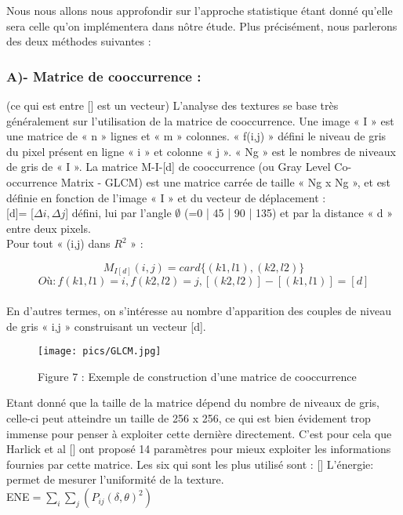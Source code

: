\documentclass[12pt]{article}
\begin{document}
Nous nous allons nous approfondir sur l’approche statistique étant donné qu’elle sera celle qu’on implémentera dans nôtre étude.
Plus précisément, nous parlerons des deux méthodes suivantes : 

\subsubsection*{A)- Matrice de cooccurrence :} (ce qui est entre [] est un vecteur)
L’analyse des textures se base très généralement sur l’utilisation de la matrice de cooccurrence.
Une image « I » est une matrice de « n » lignes et « m » colonnes. « f(i,j) » défini le niveau de gris du pixel présent en ligne « i » et  colonne « j ». « Ng » est le nombres de niveaux de gris de « I ».
La matrice M-I-[d] de cooccurrence (ou Gray Level Co-occurrence Matrix - GLCM) est une matrice carrée de taille « Ng x Ng », et est définie en fonction de l’image « I » et du vecteur de déplacement :\\

[d]= [$\Delta i, \Delta j$] défini, lui par l’angle $\emptyset$ (=0 | 45 | 90 | 135)  et par la distance « d » entre deux pixels.
\\
Pour tout « (i,j) dans $R^2$ » :

$$M_{I[d]} (i,j) = card\{ (k1,l1),(k2,l2) \}$$
$$Où: f(k1,l1)=i , f(k2,l2)=j, [(k2,l2)] - [(k1,l1)]=[d]$$\\


En d’autres termes, on s’intéresse au nombre d’apparition des couples de niveau de gris « i,j » construisant un vecteur [d].

\begin{figure}
\centering
\texttt{[image: pics/GLCM.jpg]}
\caption{ Figure 7 : Exemple de construction d’une matrice de cooccurrence}
\end{figure}


Etant donné que la taille de la matrice dépend du nombre de niveaux de gris, celle-ci peut atteindre un taille de 256 x 256, ce qui est bien évidement trop immense pour penser à exploiter cette dernière directement. C’est pour cela que Harlick et al [] ont proposé 14 paramètres pour mieux exploiter les informations fournies par cette matrice.
Les six qui sont les plus utilisé sont : []
L’énergie: permet de mesurer l’uniformité de la texture.\\

ENE$=\sum\limits_{i}\sum\limits_{j} (P_{ij}(\delta,\theta)^2)$\\
\end{document}
